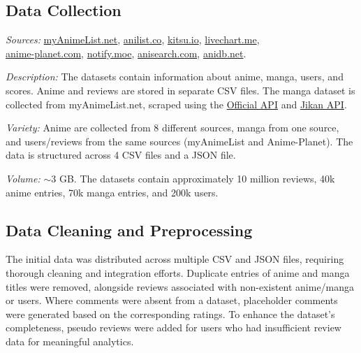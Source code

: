 \subsection{Data Collection}

\textit{Sources:}
\href{https://myanimelist.net/}{myAnimeList.net}, 
\href{https://anilist.co/}{anilist.co},
\href{https://kitsu.io/}{kitsu.io},
\href{https://livechart.me/}{livechart.me}, \\
\href{https://anime-planet.com/}{anime-planet.com},
\href{https://notify.moe/}{notify.moe},
\href{https://anisearch.com/}{anisearch.com},
\href{https://anidb.net/}{anidb.net}.

\vspace{\baselineskip}

\textit{Description:} The datasets contain information about anime, manga, users, and scores. 
Anime and reviews are stored in separate CSV files. The manga dataset is collected from myAnimeList.net, 
scraped using the \href{https://myanimelist.net/apiconfig/references/api/v2}{Official API} and \href{https://docs.api.jikan.moe/}{Jikan API}.

\vspace{\baselineskip}

\textit{Variety:} Anime are collected from 8 different sources, manga from one source, 
and users/reviews from the same sources (myAnimeList and Anime-Planet). 
The data is structured across 4 CSV files and a JSON file.

\vspace{\baselineskip}

\textit{Volume:} $\sim$3 GB\@. The datasets contain approximately 10 million reviews, 40k anime entries, 70k manga entries, 
and 200k users.

\subsection{Data Cleaning and Preprocessing}

The initial data was distributed across multiple CSV and JSON files, requiring thorough cleaning and integration efforts.
Duplicate entries of anime and manga titles were removed, alongside reviews associated with non-existent anime/manga or 
users. Where comments were absent from a dataset, placeholder comments were generated based on the corresponding 
ratings. To enhance the dataset's completeness, pseudo reviews were added for users who had insufficient review data for meaningful analytics.

